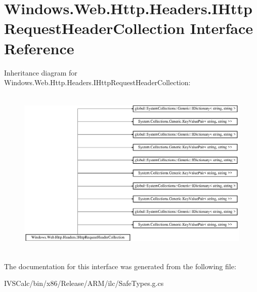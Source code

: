 \hypertarget{interface_windows_1_1_web_1_1_http_1_1_headers_1_1_i_http_request_header_collection}{}\section{Windows.\+Web.\+Http.\+Headers.\+I\+Http\+Request\+Header\+Collection Interface Reference}
\label{interface_windows_1_1_web_1_1_http_1_1_headers_1_1_i_http_request_header_collection}
Inheritance diagram for Windows.\+Web.\+Http.\+Headers.\+I\+Http\+Request\+Header\+Collection\+:\begin{figure}[H]
\begin{center}
\leavevmode
\includegraphics[height=8.213333cm]{interface_windows_1_1_web_1_1_http_1_1_headers_1_1_i_http_request_header_collection}
\end{center}
\end{figure}


The documentation for this interface was generated from the following file\+:\begin{DoxyCompactItemize}
\item 
I\+V\+S\+Calc/bin/x86/\+Release/\+A\+R\+M/ilc/Safe\+Types.\+g.\+cs\end{DoxyCompactItemize}
